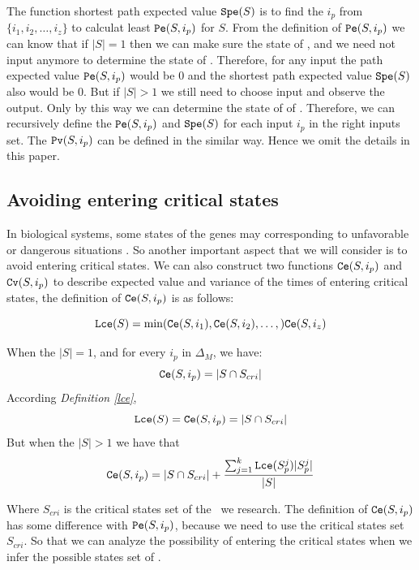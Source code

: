 The function shortest path  expected value ${\tt Spe}(S)$ is to find the $i_p$ from $\{i_1,i_2,\ldots, i_z\}$ to calculat least ${\tt Pe}(S, i_p)$ for $S$. From the definition of ${\tt Pe}(S, i_p)$ we can know that if $|S|=1$ then we can make sure the state of \BCNs, and we need not input anymore to determine the state of \BCNs. Therefore, for any input the path expected value ${\tt Pe}(S, i_p)$ would be $0$ and the shortest path expected value ${\tt Spe}(S)$ also would be $0$. But if $|S|>1$ we still need to choose input and observe the output. Only by this way we can determine the state of of \BCNs. Therefore, we can recursively define the ${\tt Pe}(S, i_p)$ and ${\tt Spe}(S)$ for each input $i_p$ in the right inputs set. The ${\tt Pv}(S, i_p)$ can be defined in the similar way. Hence we omit the details in this paper. 

\subsection{Avoiding entering critical states}
In biological systems, some states of the genes may corresponding to unfavorable or dangerous situations \cite{Li2014Controllability}. So another important aspect that we will consider is to avoid entering critical states. We can also construct two functions $\Ce(S, i_p)$ and ${\tt Cv}(S, i_p)$ to describe expected value and variance of the times of entering critical states, the definition of $\Ce(S, i_p)$ is as follows:\\
\begin{definition}[$\Lce(S)$] \label{lce}
\[{\tt Lce}(S)= \min({\tt Ce}(S, i_1),{\tt Ce}(S, i_2),\ldots,){\tt Ce}(S, i_z)\]
\end{definition}
\begin{definition}[$\Ce(S, i_p)$] 
When the $|S|=1$, and for every $i_p$ in $\Delta_M$, we have: \[{\tt Ce}(S, i_p)=|S \cap S_{cri} |\] 
According {\em Definition \ref{lce}}, %
\[{\tt Lce}(S)={\tt Ce}(S, i_p)=|S \cap S_{cri} |\] 
But when the $|S|>1$ 
we have that 
\[{\tt Ce}(S, i_p)=|S \cap S_{cri} | +\frac{\sum_{j=1}^k {\tt Lce}(S_p^j)|S_p^j|}{ |S|} \] 
\end{definition}

Where $S_{cri}$ is the critical states set of the \BCN\ we research. The definition of $\Ce(S, i_p)$ has some difference with ${\tt Pe}(S, i_p)$, because we need to use the critical states set $S_{cri}$. So that  we can analyze the possibility of entering the  critical states when we infer the possible states set of \BCNs.

